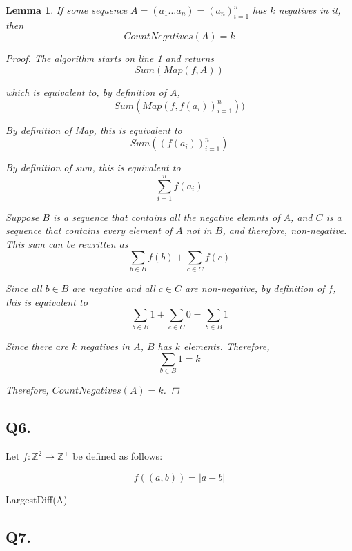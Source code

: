 \documentclass{article}
\newtheorem{lemma}{Lemma}
\theoremstyle{definition}
\begin{document}
\begin{lemma}
    If some sequence $A = (a_1\dots a_n) = (a_n)^n_{i=1}$ has $k$ negatives in it, then $$CountNegatives(A) = k$$
    \begin{proof}
        The algorithm starts on line 1 and returns 
        $$Sum(Map(f, A))$$

        which is equivalent to, by definition of $A$,
        $$Sum(Map(f, f(a_i))^n_{i=1}))$$
        
        By definition of Map, this is equivalent to 
        $$Sum((f(a_i))^n_{i=1})$$

        By definition of sum, this is equivalent to 
        $$\sum^n_{i=1}f(a_i)$$

        Suppose $B$ is a sequence that contains all the negative elemnts of $A$, and $C$ is a sequence that contains every element of $A$ not in $B$, and therefore, non-negative. This sum can be rewritten as 
        $$\sum_{b \in B} f(b) + \sum_{c \in C} f(c)$$

        Since all $b \in B$ are negative and all $c \in C$ are non-negative, by definition of $f$, this is equivalent to 
        $$\sum_{b \in B} 1 + \sum_{c \in C} 0 = \sum_{b \in B} 1$$

        Since there are $k$ negatives in $A$, $B$ has $k$ elements. Therefore,
        $$\sum_{b \in B} 1 = k$$

        Therefore, $CountNegatives(A) = k$.
    \end{proof}
\end{lemma}

\subsection{Q6.}
Let $f: \mathbb{Z}^2 \rightarrow \mathbb{Z}^+$ be defined as follows:

$$f((a, b)) = |a - b|$$

\begin{algorithm}[H]


    \caption{LargestDiff(A)}
\end{algorithm} 

\subsection{Q7.}
\end{document}
